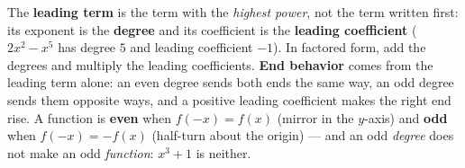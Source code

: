 \documentclass[12pt]{article}
\begin{document}
\vspace{0.14in}

\boxguard[8]
\begin{remindbox}
\small
The \textbf{leading term} is the term with the \emph{highest power}, not the term written first:
its exponent is the \textbf{degree} and its coefficient is the \textbf{leading coefficient}
($2x^2-x^5$ has degree $5$ and leading coefficient $-1$). In factored form, add the degrees and
multiply the leading coefficients. \textbf{End behavior} comes from the leading term alone: an
even degree sends both ends the same way, an odd degree sends them opposite ways, and a positive
leading coefficient makes the right end rise. A function is \textbf{even} when $f(-x)=f(x)$
(mirror in the $y$-axis) and \textbf{odd} when $f(-x)=-f(x)$ (half-turn about the origin) ---
and an odd \emph{degree} does not make an odd \emph{function}: $x^3+1$ is neither.
\end{remindbox}
\end{document}
